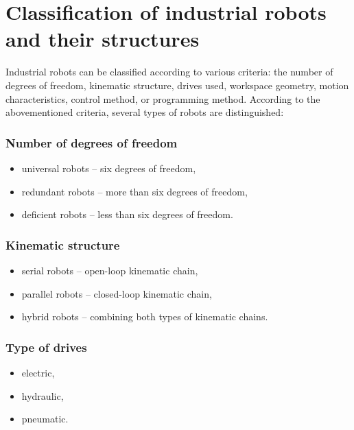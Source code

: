 
\section{Classification of industrial robots and their structures}

Industrial robots can be classified according to various criteria: the number of degrees of freedom, kinematic structure, drives used, workspace geometry, motion characteristics, control method, or programming method. According to the abovementioned criteria, several types of robots are distinguished:

\subsubsection*{Number of degrees of freedom}

\begin{itemize}
    \item universal robots -- six degrees of freedom,
    \item redundant robots -- more than six degrees of freedom,
    \item deficient robots -- less than six degrees of freedom.
\end{itemize}

\subsubsection*{Kinematic structure}

\begin{itemize}
    \item serial robots -- open-loop kinematic chain,
    \item parallel robots -- closed-loop kinematic chain,
    \item hybrid robots -- combining both types of kinematic chains.
\end{itemize}


\subsubsection*{Type of drives}

\begin{itemize}
    \item electric,
    \item hydraulic,
    \item pneumatic.
\end{itemize}

